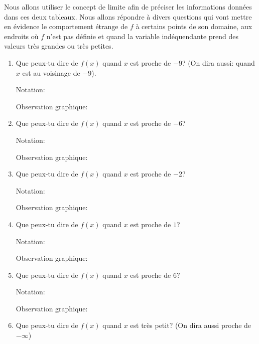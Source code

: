 \documentclass[a4paper,12pt]{report}
\begin{document}
\begin{center}

\end{center}
\begin{center}

\end{center}

Nous allons utiliser le concept de limite afin de préciser les
informations données dans ces deux tableaux. Nous allons répondre à
divers questions qui vont mettre en évidence le comportement étrange
de \(f\) à certains points de son domaine, aux endroits où \(f\) n'est pas
définie et quand la variable indéquendante prend des valeurs très
grandes ou très petites.

\begin{enumerate}
\item Que peux-tu dire de \(f(x)\) quand \(x\) est proche de \(-9\)? (On dira
aussi: quand \(x\) est au voisinage de \(-9\)).

\dotfill

\dotfill

Notation: \dotfill

Observation graphique: \dotfill
\item Que peux-tu dire de \(f(x)\) quand \(x\) est proche de \(-6\)?

\dotfill

\dotfill

Notation: \dotfill

Observation graphique: \dotfill
\item Que peux-tu dire de \(f(x)\) quand \(x\) est proche de \(-2\)?

\dotfill

\dotfill

Notation: \dotfill

Observation graphique: \dotfill
\item Que peux-tu dire de \(f(x)\) quand \(x\) est proche de \(1\)?

\dotfill

\dotfill

Notation: \dotfill

Observation graphique: \dotfill
\item Que peux-tu dire de \(f(x)\) quand \(x\) est proche de \(6\)?

\dotfill

\dotfill

Notation: \dotfill

Observation graphique: \dotfill
\item Que peux-tu dire de \(f(x)\) quand \(x\) est très petit? (On dira
aussi proche de \(-\infty\))


\end{enumerate}
\end{document}
